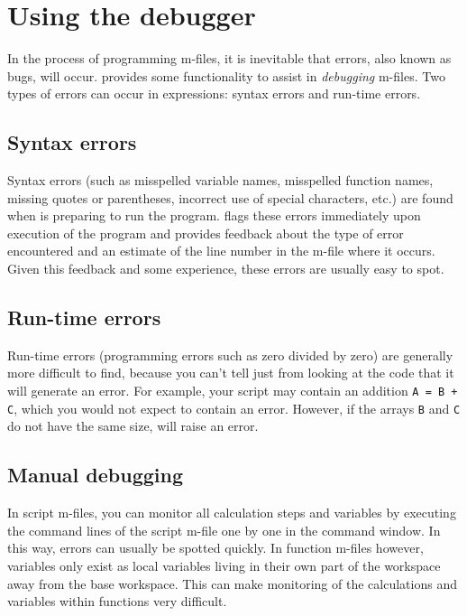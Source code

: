 \chapter{Using the debugger}
\thispagestyle{fancy}
\label{ch:debugging}

In the process of programming m-files, it is inevitable that errors, also known as bugs, will occur. \MATLAB{} provides some functionality to assist in \textit{debugging} m-files. Two types of errors can occur in \MATLAB{} expressions: syntax errors and run-time errors. 

\section{Syntax errors}
Syntax errors (such as misspelled variable names, misspelled function names, missing quotes or parentheses, incorrect use of special characters, etc.) are found when \MATLAB{} is preparing to run the program. \MATLAB{} flags these errors immediately upon execution of the program and provides feedback about the type of error encountered and an estimate of the line number in the m-file where it occurs. Given this feedback and some experience, these errors are usually easy to spot.

\section{Run-time errors}
Run-time errors (programming errors such as zero divided by zero) are generally more difficult to find, because you can't tell just from looking at the code that it will generate an error. For example, your script may contain an addition {\tt A = B + C}, which you would not expect to contain an error. However, if the arrays {\tt B} and {\tt C} do not have the same size, \MATLAB{} will raise an error.

\section{Manual debugging}
In script m-files, you can monitor all calculation steps and variables by executing the command lines of the script m-file one by one in the command window. In this way, errors can usually be spotted quickly. In function m-files however, variables only exist as local variables living in their own part of the workspace away from the base workspace. This can make monitoring of the calculations and variables within functions very difficult.

